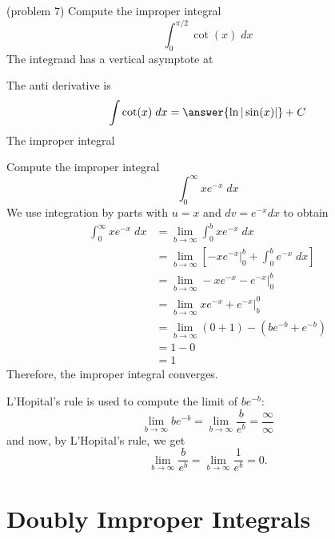 \documentclass[handout]{ximera}
\begin{document}
 \begin{problem}(problem 7)
Compute the improper integral
\[
\int_0^{\pi/2} \cot(x) \; dx
\]
The integrand has a vertical asymptote at
\begin{multipleChoice}
\end{multipleChoice}
The anti derivative is
\[
\int \cot(x) \; dx = \answer{\ln|\sin(x)|} + C
\]
The improper integral
\begin{multipleChoice}
\end{multipleChoice}
\end{problem}



\begin{example}[example 8]
Compute the improper integral
\[
\int_0^\infty xe^{-x} \; dx
\]
We use integration by parts with $u = x$ and $dv = e^{-x} dx$ to obtain
\begin{align*}
\int_0^\infty xe^{-x} \; dx &= \lim_{b \to \infty} \int_0^b xe^{-x} \; dx\\
                                 &= \lim_{b \to \infty}  \left[ -xe^{-x}\bigg|_0^b + \int_0^b e^{-x} \; dx \right]   \\
                                 &= \lim_{b \to \infty}  -xe^{-x}- e^{-x}\bigg|_0^b  \\
                                 &= \lim_{b \to \infty}  xe^{-x} + e^{-x}\bigg|_b^0  \\
                                 &= \lim_{b \to \infty}  (0+1) - (be^{-b} + e^{-b})    \\
                                 &=  1 - 0  \\
                                 &= 1
\end{align*}
 Therefore, the improper integral converges.
 \begin{remark}
 L'Hopital's rule is used to compute the limit of $be^{-b}$:
 \[
 \lim_{b \to \infty} be^{-b} = \lim_{b \to \infty} \frac{b}{e^b} = \frac{\infty}{\infty}
 \]
 and now, by L'Hopital's rule, we get
 \[
 \lim_{b \to \infty} \frac{b}{e^b} = \lim_{b \to \infty} \frac{1}{e^b} = 0.
 \]
 \end{remark}
 
 \end{example}

           
           

\section{Doubly Improper Integrals}
\end{document}
